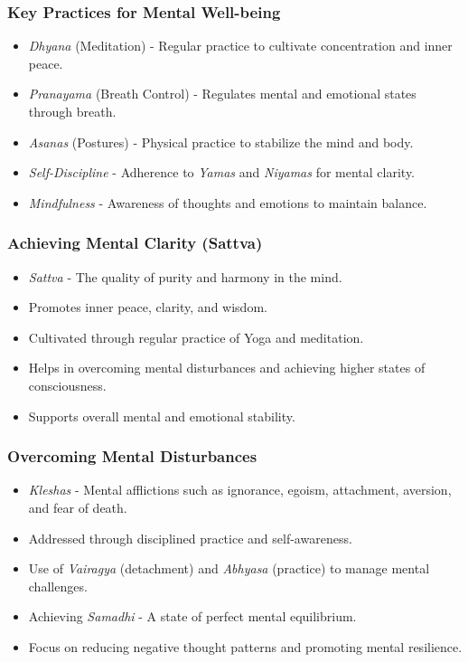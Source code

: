 \begin{frame}[fragile]\frametitle{Key Practices for Mental Well-being}

      \begin{itemize}
		\item \textit{Dhyana} (Meditation) - Regular practice to cultivate concentration and inner peace.
		\item \textit{Pranayama} (Breath Control) - Regulates mental and emotional states through breath.
		\item \textit{Asanas} (Postures) - Physical practice to stabilize the mind and body.
		\item \textit{Self-Discipline} - Adherence to \textit{Yamas} and \textit{Niyamas} for mental clarity.
		\item \textit{Mindfulness} - Awareness of thoughts and emotions to maintain balance.
	  \end{itemize}

\end{frame}

\begin{frame}[fragile]\frametitle{Achieving Mental Clarity (Sattva)}

      \begin{itemize}
		\item \textit{Sattva} - The quality of purity and harmony in the mind.
		\item Promotes inner peace, clarity, and wisdom.
		\item Cultivated through regular practice of Yoga and meditation.
		\item Helps in overcoming mental disturbances and achieving higher states of consciousness.
		\item Supports overall mental and emotional stability.
	  \end{itemize}

\end{frame}

\begin{frame}[fragile]\frametitle{Overcoming Mental Disturbances}

      \begin{itemize}
		\item \textit{Kleshas} - Mental afflictions such as ignorance, egoism, attachment, aversion, and fear of death.
		\item Addressed through disciplined practice and self-awareness.
		\item Use of \textit{Vairagya} (detachment) and \textit{Abhyasa} (practice) to manage mental challenges.
		\item Achieving \textit{Samadhi} - A state of perfect mental equilibrium.
		\item Focus on reducing negative thought patterns and promoting mental resilience.
	  \end{itemize}

\end{frame}

